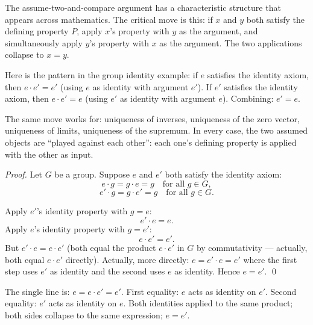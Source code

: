 \begin{remark}
The assume-two-and-compare argument has a characteristic structure that
appears across mathematics. The critical move is this: if $x$ and $y$
both satisfy the defining property $P$, apply $x$'s property with $y$
as the argument, and simultaneously apply $y$'s property with $x$ as
the argument. The two applications collapse to $x = y$.

Here is the pattern in the group identity example: if $e$ satisfies
the identity axiom, then $e \cdot e' = e'$ (using $e$ as identity with
argument $e'$). If $e'$ satisfies the identity axiom, then $e \cdot e' = e$
(using $e'$ as identity with argument $e$). Combining: $e' = e$.

The same move works for: uniqueness of inverses, uniqueness of the
zero vector, uniqueness of limits, uniqueness of the supremum.
In every case, the two assumed objects are ``played against each other'':
each one's defining property is applied with the other as input.
\end{remark}

\begin{example}
\textit{Proof.}
Let $G$ be a group. Suppose $e$ and $e'$ both satisfy the identity axiom:
\[
e \cdot g = g \cdot e = g \quad \text{for all } g \in G,
\]
\[
e' \cdot g = g \cdot e' = g \quad \text{for all } g \in G.
\]

Apply $e'$'s identity property with $g = e$:
\[
e' \cdot e = e.
\]
Apply $e$'s identity property with $g = e'$:
\[
e \cdot e' = e'.
\]
But $e' \cdot e = e \cdot e'$ (both equal the product $e \cdot e'$ in $G$
by commutativity --- actually, both equal $e \cdot e'$ directly).
Actually, more directly: $e = e' \cdot e = e'$ where the first step
uses $e'$ as identity and the second uses $e$ as identity.
Hence $e = e'$. \qed

\medskip\noindent
The single line is: $e = e \cdot e' = e'$.
First equality: $e$ acts as identity on $e'$.
Second equality: $e'$ acts as identity on $e$.
Both identities applied to the same product; both sides collapse to
the same expression; $e = e'$.
\end{example}

